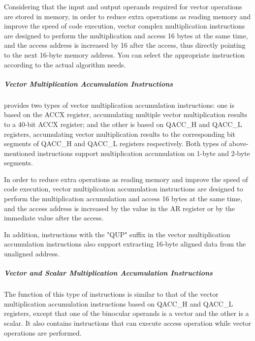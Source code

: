 \documentclass[main\_\_EN.tex]{subfiles}
\begin{document}
Considering that the input and output operands required for vector operations are stored in memory, in order to reduce extra operations as reading memory and improve the speed of code execution, vector complex multiplication instructions are designed to perform the multiplication and access 16 bytes at the same time, and the access address is increased by 16 after the access, thus directly pointing to the next 16-byte memory address. You can select the appropriate instruction according to the actual algorithm needs.





\subparagraph{Vector Multiplication Accumulation Instructions}

\chipname{} provides two types of vector multiplication accumulation instructions: one is based on the ACCX register, accumulating multiple vector multiplication results to a 40-bit ACCX register; and the other is based on QACC\_H and QACC\_L registers, accumulating vector multiplication results to the corresponding bit segments of QACC\_H and QACC\_L registers respectively. Both types of above-mentioned instructions support multiplication accumulation on 1-byte and 2-byte segments.

In order to reduce extra operations as reading memory and improve the speed of code execution, vector multiplication accumulation instructions are designed to perform the multiplication accumulation and access 16 bytes at the same time, and the access address is increased by the value in the AR register or by the immediate value after the access.

In addition, instructions with the "QUP" suffix in the vector multiplication accumulation instructions also support extracting 16-byte aligned data from the unaligned address.




\subparagraph{Vector and Scalar Multiplication Accumulation Instructions}

The function of this type of instructions is similar to that of the vector multiplication accumulation instructions based on QACC\_H and QACC\_L registers, except that one of the binocular operands is a vector and the other is a scalar. It also contains instructions that can execute access operation while vector operations are performed.
\end{document}
